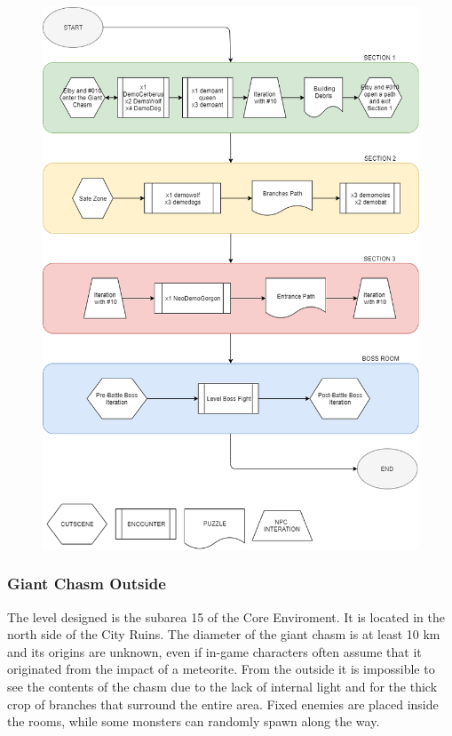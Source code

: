 \begin{figure}[H]
	\centering
	\includegraphics[width=0.95\linewidth]{images/graphs/level_description.png}
\end{figure}
\newpage


\subsubsection{Giant Chasm Outside}
The level designed is the subarea 15 of the Core Enviroment. It is located in the north side of the City Ruins. The diameter of the giant chasm is at least 10 km and its origins are unknown, even if in-game characters often assume that it originated from the impact of a meteorite. From the outside it is impossible to see the contents of the chasm due to the lack of internal light and for the thick crop of branches that surround the entire area. Fixed enemies are placed inside the rooms, while some monsters can randomly spawn along the way.

